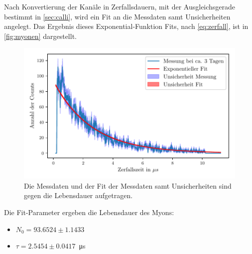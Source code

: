 Nach Konvertierung der Kanäle in Zerfallsdauern, mit der Ausgleichsgerade bestimmt in \autoref{sec:calli}, wird ein Fit an die Messdaten samt Unsicherheiten angelegt.
Das Ergebnis dieses Exponential-Funktion Fits, nach \autoref{eq:zerfall}, ist in \autoref{fig:myonen} dargestellt.

\begin{figure}[H]
    \centering
    \includegraphics{images/messung_fit.pdf}
    \caption{Die Messdaten und der Fit der Messdaten samt Unsicherheiten sind gegen die Lebensdauer aufgetragen.}
    \label{fig:myonen}
\end{figure}

Die Fit-Parameter ergeben die Lebensdauer des Myons:
\begin{itemize}
    \item $N_0 = 93.6524 \pm 1.1433$
    \item $\tau = 2.5454 \pm 0.0417$\ \si{\micro\second}
\end{itemize}